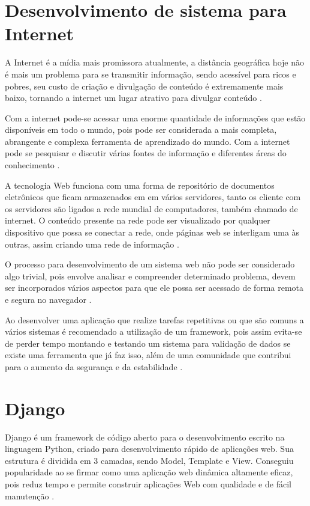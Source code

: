 \documentclass{ifto-tex}
\begin{document}
	\section{Desenvolvimento de sistema para Internet}
A Internet é a mídia mais promissora atualmente, a distância geográfica hoje não é mais um problema para se transmitir informação, sendo acessível para ricos e pobres, seu custo de criação e divulgação de conteúdo é extremamente mais baixo, tornando a internet um lugar atrativo para divulgar conteúdo \cite{moran1997utilizar}.

Com a internet pode-se acessar uma enorme quantidade de informações que estão disponíveis em todo o mundo, pois pode ser considerada a mais completa, abrangente e complexa ferramenta de aprendizado do mundo. Com a internet pode se pesquisar e discutir várias fontes de informação e diferentes áreas do conhecimento \cite{garcia2002internet}.

A tecnologia Web funciona com uma forma de repositório de documentos eletrônicos que ficam armazenados em em vários servidores, tanto os cliente com os servidores são ligados a rede mundial de computadores, também chamado de internet. O conteúdo presente na rede pode ser visualizado por qualquer dispositivo que possa se conectar a rede, onde páginas web se interligam uma às outras, assim criando uma rede de informação \cite{junior2009sistemas}.

O processo para desenvolvimento de um sistema web não pode ser considerado algo trivial, pois envolve analisar e compreender determinado problema, devem ser incorporados vários aspectos para que ele possa ser acessado de forma remota e segura no navegador \cite{miletto2014desenvolvimento}.

Ao desenvolver uma aplicação que realize tarefas repetitivas ou que são comuns a vários sistemas é recomendado a utilização de um framework, pois assim evita-se de perder tempo montando e testando um sistema para validação de dados se existe uma ferramenta que já faz isso, além de uma comunidade que contribui para o aumento da segurança e da estabilidade \cite{OqueeumF24:online}.

	
	\section{Django}
Django é um framework de código aberto para o desenvolvimento escrito na linguagem Python, criado para desenvolvimento rápido de aplicações web.  Sua estrutura é dividida em 3 camadas, sendo Model, Template e View. Conseguiu popularidade ao se firmar como uma aplicação web dinâmica altamente eficaz, pois reduz tempo e permite construir aplicações Web com qualidade e de fácil manutenção \cite{badindesenvolvimento}.
\end{document}
